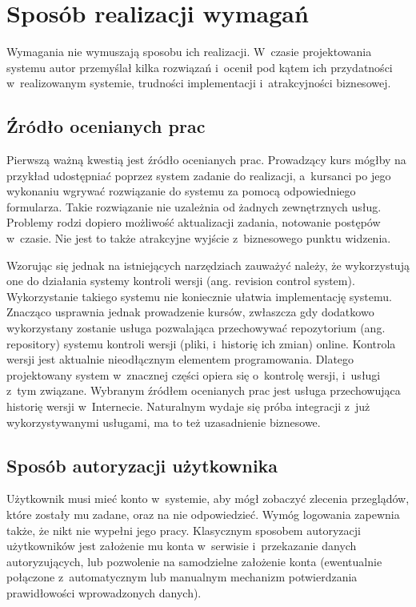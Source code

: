 \chapter{Sposób realizacji wymagań}

Wymagania nie wymuszają sposobu ich realizacji. W~czasie projektowania systemu autor przemyślał kilka rozwiązań i~ocenił pod kątem ich przydatności w~realizowanym systemie, trudności implementacji i~atrakcyjności biznesowej.

\section{Źródło ocenianych prac}
Pierwszą ważną kwestią jest źródło ocenianych prac. Prowadzący kurs mógłby na przykład udostępniać poprzez system zadanie do realizacji, a~kursanci po jego wykonaniu wgrywać rozwiązanie do systemu za pomocą odpowiedniego formularza. Takie rozwiązanie nie uzależnia od żadnych zewnętrznych usług. Problemy rodzi dopiero możliwość aktualizacji zadania, notowanie postępów w~czasie. Nie jest to także atrakcyjne wyjście z~biznesowego punktu widzenia.

\medskip
Wzorując się jednak na istniejących narzędziach zauważyć należy, że wykorzystują one do działania systemy kontroli wersji (ang. revision control system). Wykorzystanie takiego systemu nie koniecznie ułatwia implementację systemu. Znacząco usprawnia jednak prowadzenie kursów, zwłaszcza gdy dodatkowo wykorzystany zostanie usługa pozwalająca przechowywać repozytorium (ang. repository) systemu kontroli wersji (pliki, i~historię ich zmian) online. Kontrola wersji jest aktualnie nieodłącznym elementem programowania. Dlatego projektowany system w~znacznej części opiera się o~kontrolę wersji, i~usługi z~tym związane. Wybranym źródłem ocenianych prac jest usługa przechowująca historię wersji w~Internecie. Naturalnym wydaje się próba integracji z~już wykorzystywanymi usługami, ma to też uzasadnienie biznesowe.

\section{Sposób autoryzacji użytkownika}
Użytkownik musi mieć konto w~systemie, aby mógł zobaczyć zlecenia przeglądów, które zostały mu zadane, oraz na nie odpowiedzieć. Wymóg logowania zapewnia także, że nikt nie wypełni jego pracy. Klasycznym sposobem autoryzacji użytkowników jest założenie mu konta w~serwisie i~przekazanie danych autoryzujących, lub pozwolenie na samodzielne założenie konta (ewentualnie połączone z~automatycznym lub manualnym mechanizm potwierdzania prawidłowości wprowadzonych danych).

